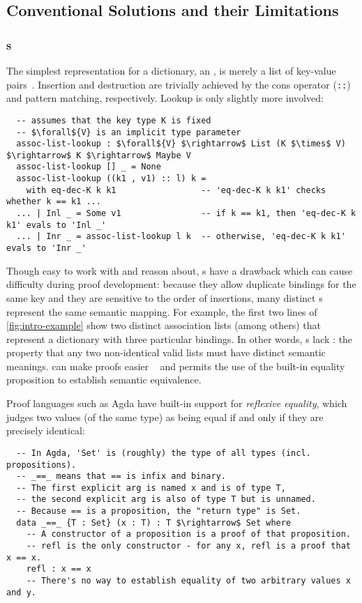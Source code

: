 \subsection{Conventional Solutions and their Limitations}



\subsubsection{\Sal{}s}

The simplest representation for a dictionary, an \emph{\sal}, is merely a list of key-value pairs~\citep[Lists]{Pierce:SF1}.
%
Insertion and destruction are trivially achieved by the cons operator (\texttt{::}) and pattern matching, respectively.
%
Lookup is only slightly more involved:
%
\begin{lstlisting}
  -- assumes that the key type K is fixed
  -- $\forall${V} is an implicit type parameter
  assoc-list-lookup : $\forall${V} $\rightarrow$ List (K $\times$ V) $\rightarrow$ K $\rightarrow$ Maybe V
  assoc-list-lookup [] _ = None
  assoc-list-lookup ((k1 , v1) :: l) k =
    with eq-dec-K k k1                 -- 'eq-dec-K k k1' checks whether k == k1 ...
  ... | Inl _ = Some v1                -- if k == k1, then 'eq-dec-K k k1' evals to 'Inl _'
  ... | Inr _ = assoc-list-lookup l k  -- otherwise, 'eq-dec-K k k1' evals to 'Inr _'
\end{lstlisting}


Though easy to work with and reason about, \sal{}s have a drawback which can cause difficulty during proof development:
%
because they allow duplicate bindings for the same key and they are sensitive to the order of insertions, many distinct \sal{}s represent the same semantic mapping.
%
For example, the first two lines of \autoref{fig:intro-example}
%
show two distinct association lists (among others) that represent a dictionary with three particular bindings.
%
In other words, \sal{}s lack \firstUseGoal{\Extensional}: the property that any two non-identical valid lists must have distinct semantic meanings.
%
\Extensional{} can make proofs easier ~\cite[Maps]{Pierce:SF1} and permits the use of the built-in equality proposition to establish semantic equivalence.
%

Proof languages such as Agda have built-in support for \emph{reflexive equality}, which judges two values (of the same type) as being equal if and only if they are precisely identical:
\begin{lstlisting}
  -- In Agda, 'Set' is (roughly) the type of all types (incl. propositions).
  -- _==_ means that == is infix and binary.
  -- The first explicit arg is named x and is of type T,
  -- the second explicit arg is also of type T but is unnamed.
  -- Because == is a proposition, the "return type" is Set.
  data _==_ {T : Set} (x : T) : T $\rightarrow$ Set where
    -- A constructor of a proposition is a proof of that proposition.
    -- refl is the only constructor - for any x, refl is a proof that x == x.
    refl : x == x
    -- There's no way to establish equality of two arbitrary values x and y.
\end{lstlisting}


